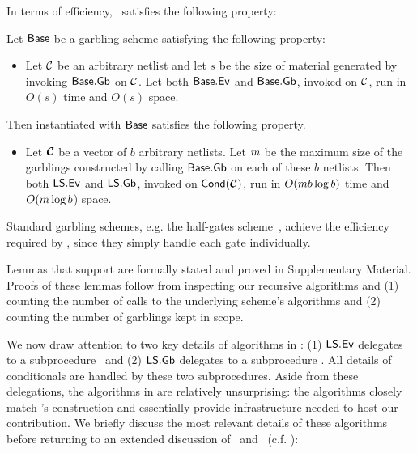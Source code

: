 In terms of efficiency, \ourschemelong\ satisfies the following
property:
\begin{theorem}\label{thm:efficiency}
  Let $\textsf{Base}$ be a garbling scheme satisfying the following
  property:
  \begin{itemize}
    \item Let $\mathcal C$ be an arbitrary netlist and let $s$ be the size of
      material generated by invoking $\textsf{Base}.\textsf{Gb}$ on $\mathcal C$.
      Let both $\textsf{Base}.\textsf{Ev}$ and $\textsf{Base}.\textsf{Gb}$, invoked
      on $\mathcal C$, run in $O(s)$ time and $O(s)$ space.
  \end{itemize}
  Then  instantiated with $\textsf{Base}$ satisfies the
  following property.
  \begin{itemize}
    \item Let $\vec{\cir}$ be a vector of $b$ arbitrary netlists. Let $m$ be
      the maximum size of the garblings constructed by calling
      $\textsf{Base}.\textsf{Gb}$ on each of these $b$ netlists.
      Then both $\textsf{LS}.\textsf{Ev}$ and $\textsf{LS}.\textsf{Gb}$, invoked on
      $\conditional(\vec{\cir})$, run in
      $O(m b \log b)$ time and $O(m \log b$) space.
  \end{itemize}
\end{theorem}
Standard garbling schemes, e.g. the
half-gates scheme~\cite{EC:ZahRosEva15}, achieve the efficiency
required by , since they simply handle each gate
individually.

Lemmas that support  are formally stated and proved in
Supplementary Material.
Proofs of these lemmas follow from inspecting our recursive algorithms
and (1) counting the number of calls to the underlying scheme's
algorithms and (2) counting the number of garblings kept in scope.

We now draw attention to two key details of algorithms in
:
(1) $\textsf{LS}.\textsf{Ev}$ delegates to a subprocedure \evcond\ and (2)
$\textsf{LS}.\textsf{Gb}$ delegates to a subprocedure \gbcond.
%
All details of conditionals are handled by these two subprocedures.
%
Aside from these delegations, the algorithms in  are
relatively unsurprising:
the algorithms closely match \HK's construction and essentially
provide 
infrastructure needed to host our contribution.
%
We briefly discuss the most relevant details of these 
algorithms before returning
to an extended discussion of \evcond\ and \gbcond~(c.f. ):

